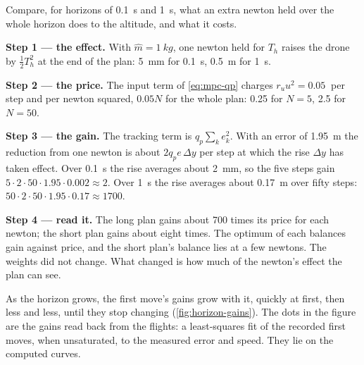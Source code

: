 \begin{example}
\label{ex:horizon-buys}
Compare, for horizons of \SI{0.1}{s} and \SI{1}{s}, what an extra newton held over the whole horizon does to the altitude, and what it costs.

\textbf{Step 1 — the effect.} With $\hat m = \SI{1}{kg}$, one newton held for $T_h$ raises the drone by $\tfrac12 T_h^2$ at the end of the plan: \SI{5}{mm} for \SI{0.1}{s}, \SI{0.5}{m} for \SI{1}{s}.

\textbf{Step 2 — the price.} The input term of \cref{eq:mpc-qp} charges $r_u u^2 = \SI{0.05}{}$ per step and per newton squared, $0.05N$ for the whole plan: 0.25 for $N = 5$, 2.5 for $N = 50$.

\textbf{Step 3 — the gain.} The tracking term is $q_p\sum_k e_k^2$. With an error of \SI{1.95}{m} the reduction from one newton is about $2q_p e\,\Delta y$ per step at which the rise $\Delta y$ has taken effect. Over \SI{0.1}{s} the rise averages about \SI{2}{mm}, so the five steps gain $5 \cdot 2 \cdot 50 \cdot 1.95 \cdot 0.002 \approx 2$. Over \SI{1}{s} the rise averages about \SI{0.17}{m} over fifty steps: $50 \cdot 2 \cdot 50 \cdot 1.95 \cdot 0.17 \approx 1700$.

\textbf{Step 4 — read it.} The long plan gains about 700 times its price for each newton; the short plan gains about eight times. The optimum of each balances gain against price, and the short plan's balance lies at a few newtons. The weights did not change. What changed is how much of the newton's effect the plan can see.
\end{example}

As the horizon grows, the first move's gains grow with it, quickly at first, then less and less, until they stop changing (\cref{fig:horizon-gains}). The dots in the figure are the gains read back from the flights: a least-squares fit of the recorded first moves, when unsaturated, to the measured error and speed. They lie on the computed curves.


